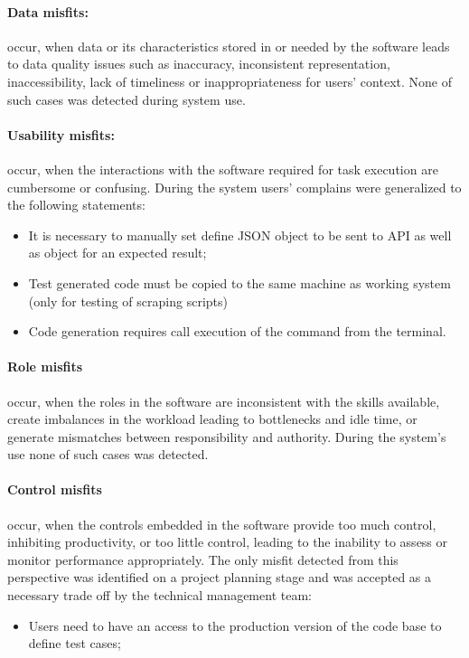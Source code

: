 \paragraph{Data misfits:}  occur, when data or its characteristics stored in or needed by the software leads to data quality issues such as inaccuracy, inconsistent representation, inaccessibility, lack of timeliness or inappropriateness for users' context. None of such cases was detected during system use.

\paragraph{Usability misfits:}  occur, when the interactions with the software required for task execution are cumbersome or confusing. During the system users' complains were generalized to the following statements: 
\begin{itemize}
	\item It is necessary to manually set define JSON object to be sent to API as well as object for an expected result;
	\item Test generated code must be copied to the same machine as working system (only for testing of scraping scripts)
	\item Code generation requires call execution of the command from the terminal.
\end{itemize}


\paragraph{Role misfits} occur, when the roles in the software are inconsistent with the skills available, create imbalances in the workload leading to bottlenecks and idle time, or generate mismatches between responsibility and authority. During the system's use none of such cases was detected.

\paragraph{Control misfits} occur, when the controls embedded in the software provide too much control, inhibiting productivity, or too little control, leading to the inability to assess or monitor performance appropriately. The only misfit detected from this perspective was identified on a project planning stage and was accepted as a necessary trade off by the technical management team:
\begin{itemize}
	\item Users need to have an access to the production version of the code base to define test cases;
\end{itemize}

